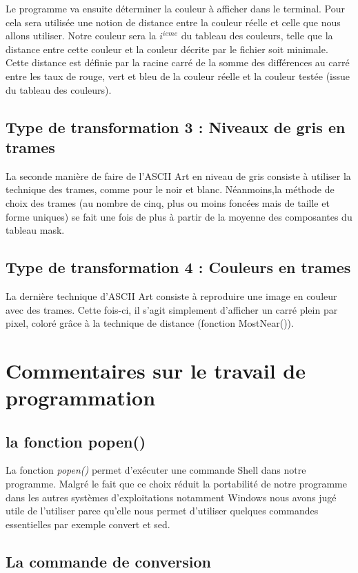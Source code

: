 \documentclass{article}
\begin{document}
Le programme va ensuite déterminer la couleur à afficher dans le terminal. Pour cela sera utilisée une notion de distance entre la couleur réelle et celle que nous allons utiliser. Notre couleur sera la $i^{ieme}$ du tableau des couleurs, telle que la distance entre cette couleur et la couleur décrite par le fichier soit minimale. Cette distance est définie par la racine carré de la somme des différences au carré entre les taux de rouge, vert et bleu de la couleur réelle et la couleur testée (issue du tableau des couleurs). 
\newline

\subsection{Type de transformation 3 : Niveaux de gris en trames}
La seconde manière de faire de l'ASCII Art en niveau de gris consiste à utiliser la technique des trames, comme pour le noir et blanc. Néanmoins,la méthode de choix des trames (au nombre de cinq, plus ou moins foncées mais de taille et forme uniques) se fait une fois de plus à partir de la moyenne des composantes du tableau mask. 
\newline

\subsection{Type de transformation 4 : Couleurs en trames}
La dernière technique d'ASCII Art consiste à reproduire une image en couleur avec des trames. Cette fois-ci, il s'agit simplement d'afficher un carré plein par pixel, coloré grâce à la technique de distance (fonction MostNear()).  

\section{Commentaires sur le travail de programmation}
\subsection{la fonction popen()}

La fonction \emph{popen()} permet d'exécuter une commande Shell dans notre programme. Malgré le fait que ce choix réduit la portabilité de notre programme dans les autres systèmes d'exploitations notamment Windows nous avons jugé utile de l'utiliser parce qu'elle nous permet d'utiliser quelques commandes essentielles par exemple convert et sed.
\subsection{La commande de conversion}
\end{document}
